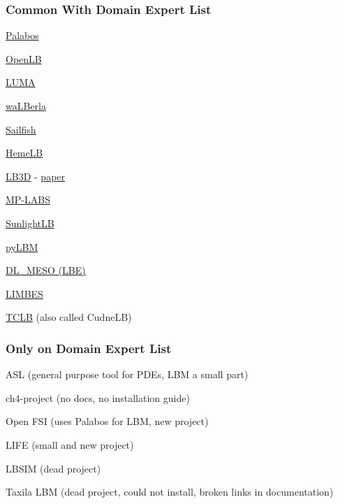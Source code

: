 \documentclass[t,12pt,numbers,fleqn]{beamer}
\begin{document}

\begin{frame}
\frametitle{Common With Domain Expert List}

\begin{multicols}{2}	
  \bi
\item \href{https://palabos.unige.ch/}{Palabos}
\item \href{https://www.openlb.net/}{OpenLB}
\item \href{https://github.com/aharwood2/LUMA/}{LUMA}
\item \href{https://www.walberla.net}{waLBerla}
\item \href{http://sailfish.us.edu.pl/}{Sailfish}
\item \href{https://github.com/UCL/hemelb}{HemeLB}
\item \href{http://ccs.chem.ucl.ac.uk/lb3d}{LB3D} - \href{https://www.sciencedirect.com/science/article/pii/S0010465517301017}{paper}
\item \href{https://github.com/carlosrosales/mplabs}{MP-LABS}
\item \href{http://sunlightlb.sourceforge.net/}{SunlightLB}
\item \href{https://pypi.org/project/pylbm/}{pyLBM}
\item  \href{https://www.scd.stfc.ac.uk/Pages/DL_MESO.aspx}{DL\_MESO (LBE)}
\item \href{https://code.google.com/archive/p/limbes/}{LIMBES}
\item \href{https://docs.tclb.io/}{TCLB} (also called CudneLB)
\ei
\end{multicols}

\end{frame}


\begin{frame}
\frametitle{Only on Domain Expert List}

  \bi
\item ASL (general purpose tool for PDEs, LBM a small part)
\item ch4-project (no docs, no installation guide)
\item Open FSI (uses Palabos for LBM, new project)
\item LIFE (small and new project)
\item LBSIM (dead project)
\item Taxila LBM (dead project, could not install, broken links in
  documentation)                    
	\ei

\end{frame}
\end{document}
